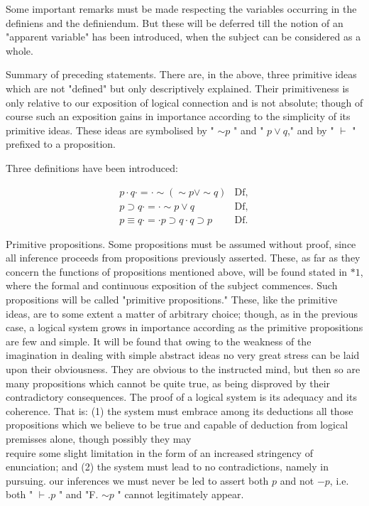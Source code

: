 \documentclass[10pt]{article}
\begin{document}
Some important remarks must be made respecting the variables occurring in the definiens and the definiendum. But these will be deferred till the notion of an "apparent variable" has been introduced, when the subject can be considered as a whole.

Summary of preceding statements. There are, in the above, three primitive ideas which are not "defined" but only descriptively explained. Their primitiveness is only relative to our exposition of logical connection and is not absolute; though of course such an exposition gains in importance according to the simplicity of its primitive ideas. These ideas are symbolised by " $\sim p$ " and " $p \vee q$," and by " $\vdash$ " prefixed to a proposition.

Three definitions have been introduced:

$$
\begin{array}{lll}
p \cdot q \cdot=\cdot \sim(\sim p \vee \sim q) & \mathrm{Df}, \\
p \supset q \cdot=\cdot \sim p \vee q & \mathrm{Df}, \\
p \equiv q \cdot=\cdot p \supset q \cdot q \supset p & \mathrm{Df} .
\end{array}
$$

Primitive propositions. Some propositions must be assumed without proof, since all inference proceeds from propositions previously asserted. These, as far as they concern the functions of propositions mentioned above, will be found stated in $* 1$, where the formal and continuous exposition of the subject commences. Such propositions will be called "primitive propositions." These, like the primitive ideas, are to some extent a matter of arbitrary choice; though, as in the previous case, a logical system grows in importance according as the primitive propositions are few and simple. It will be found that owing to the weakness of the imagination in dealing with simple abstract ideas no very great stress can be laid upon their obviousness. They are obvious to the instructed mind, but then so are many propositions which cannot be quite true, as being disproved by their contradictory consequences. The proof of a logical system is its adequacy and its coherence. That is: (1) the system must embrace among its deductions all those propositions which we believe to be true and capable of deduction from logical premisses alone, though possibly they may\\
require some slight limitation in the form of an increased stringency of enunciation; and (2) the system must lead to no contradictions, namely in pursuing. our inferences we must never be led to assert both $p$ and not $-p$, i.e. both " $\vdash . p$ " and "F. $\sim p$ " cannot legitimately appear.
\end{document}
